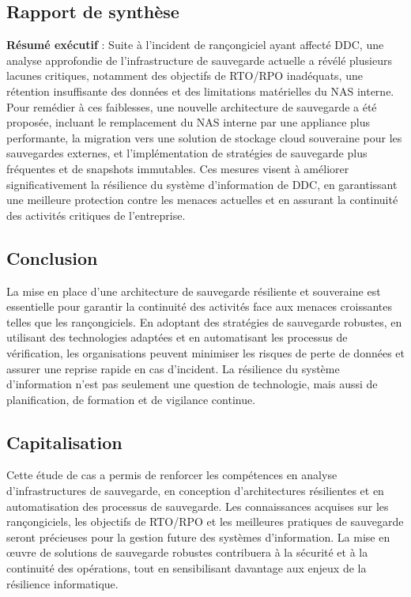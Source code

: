 \subsection*{Rapport de synthèse}
{}
\noindent \textbf{Résumé exécutif} :
Suite à l'incident de rançongiciel ayant affecté DDC, une analyse approfondie de l'infrastructure de sauvegarde actuelle a révélé plusieurs lacunes critiques, notamment des objectifs de RTO/RPO inadéquats, une rétention insuffisante des données et des limitations matérielles du NAS interne. Pour remédier à ces faiblesses, une nouvelle architecture de sauvegarde a été proposée, incluant le remplacement du NAS interne par une appliance plus performante, la migration vers une solution de stockage cloud souveraine pour les sauvegardes externes, et l'implémentation de stratégies de sauvegarde plus fréquentes et de snapshots immutables. Ces mesures visent à améliorer significativement la résilience du système d'information de DDC, en garantissant une meilleure protection contre les menaces actuelles et en assurant la continuité des activités critiques de l'entreprise.

\vspace{0.5cm}


\subsection*{Conclusion}
{}
\noindent La mise en place d'une architecture de sauvegarde résiliente et souveraine est essentielle pour garantir la continuité des activités face aux menaces croissantes telles que les rançongiciels. En adoptant des stratégies de sauvegarde robustes, en utilisant des technologies adaptées et en automatisant les processus de vérification, les organisations peuvent minimiser les risques de perte de données et assurer une reprise rapide en cas d'incident. La résilience du système d'information n'est pas seulement une question de technologie, mais aussi de planification, de formation et de vigilance continue.

\newpage

\subsection*{Capitalisation}
{}
\noindent Cette étude de cas a permis de renforcer les compétences en analyse d'infrastructures de sauvegarde, en conception d'architectures résilientes et en automatisation des processus de sauvegarde. Les connaissances acquises sur les rançongiciels, les objectifs de RTO/RPO et les meilleures pratiques de sauvegarde seront précieuses pour la gestion future des systèmes d'information. La mise en œuvre de solutions de sauvegarde robustes contribuera à la sécurité et à la continuité des opérations, tout en sensibilisant davantage aux enjeux de la résilience informatique.

